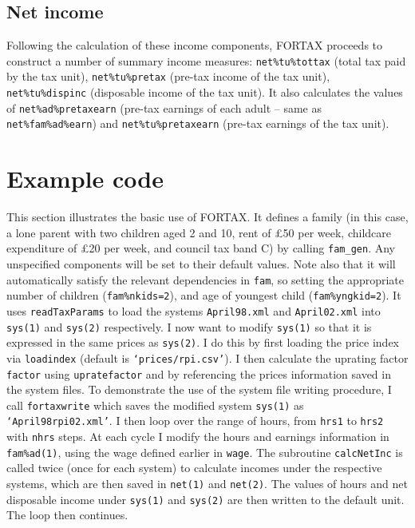 \documentclass[11pt,thmsa,letter,ukenglish]{article}
\begin{document}
\subsection{Net income}
Following the calculation of these income components, FORTAX proceeds to construct a number of summary income measures: \texttt{net\%tu\%tottax} (total tax paid by the tax unit), \texttt{net\%tu\%pretax} (pre-tax income of the tax unit), \texttt{net\%tu\%dispinc} (disposable income of the tax unit). It also calculates the values of \texttt{net\%ad\%pretaxearn} (pre-tax earnings of each adult -- same as \texttt{net\%fam\%ad\%earn}) and \texttt{net\%tu\%pretaxearn} (pre-tax earnings of the tax unit).

\section{Example code}\label{sec:example}

This section illustrates the basic use of FORTAX. It defines a family (in this case, a lone parent with two children aged 2 and 10, rent of \pounds 50 per week, childcare expenditure of \pounds 20 per week, and council tax band C) by calling \texttt{fam\_gen}. Any unspecified components will be set to their default values. Note also that it will automatically satisfy the relevant dependencies in \texttt{fam}, so setting the appropriate number of children (\texttt{fam\%nkids=2}), and age of youngest child (\texttt{fam\%yngkid=2}). It uses \texttt{readTaxParams} to load the systems \texttt{April98.xml} and \texttt{April02.xml} into \texttt{sys(1)} and \texttt{sys(2)} respectively. I now want to modify \texttt{sys(1)} so that it is expressed in the same prices as \texttt{sys(2)}. I do this by first loading the price index via \texttt{loadindex} (default is \texttt{`prices/rpi.csv'}). I then calculate the uprating factor \texttt{factor} using \texttt{upratefactor} and by referencing the prices information saved in the system files. To demonstrate the use of the system file writing procedure, I call \texttt{fortaxwrite} which saves the modified system \texttt{sys(1)} as \texttt{`April98rpi02.xml'}. I then loop over the range of hours, from \texttt{hrs1} to \texttt{hrs2} with \texttt{nhrs} steps. At each cycle I modify the hours and earnings information in \texttt{fam\%ad(1)}, using the wage defined earlier in \texttt{wage}. The subroutine \texttt{calcNetInc} is called twice (once for each system) to calculate incomes under the respective systems, which are then saved in \texttt{net(1)} and \texttt{net(2)}. The values of hours and net disposable income under \texttt{sys(1)} and \texttt{sys(2)} are then written to the default unit. The loop then continues.
\end{document}

